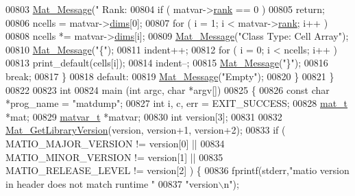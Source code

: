 \begin{DoxyCode}
{{{{{{{{{{{{{{{{{{{{{{{{{{{{{{{{{{{{{{{{{{{{{00803             \hyperlink{group__mat__util_gae7dfa394b111bc908a616f8f5bddaa97}{Mat\_Message}(\textcolor{stringliteral}{"      Rank: %
00804             \textcolor{keywordflow}{if} ( matvar->\hyperlink{group___m_a_t_a84ba70c96ded13cc555fa75b768d9921}{rank} == 0 )
00805                 \textcolor{keywordflow}{return};
00806             ncells = matvar->\hyperlink{group___m_a_t_a8e01234e1c862ce3472bb37f5a09b92c}{dims}[0];
00807             \textcolor{keywordflow}{for} ( i = 1; i < matvar->\hyperlink{group___m_a_t_a84ba70c96ded13cc555fa75b768d9921}{rank}; i++ )
00808                 ncells *= matvar->\hyperlink{group___m_a_t_a8e01234e1c862ce3472bb37f5a09b92c}{dims}[i];
00809             \hyperlink{group__mat__util_gae7dfa394b111bc908a616f8f5bddaa97}{Mat\_Message}(\textcolor{stringliteral}{"Class Type: Cell Array"});
00810             \hyperlink{group__mat__util_gae7dfa394b111bc908a616f8f5bddaa97}{Mat\_Message}(\textcolor{stringliteral}{"\{"});
00811             indent++;
00812             \textcolor{keywordflow}{for} ( i = 0; i < ncells; i++ )
00813                 print\_default(cells[i]);
00814             indent--;
00815             \hyperlink{group__mat__util_gae7dfa394b111bc908a616f8f5bddaa97}{Mat\_Message}(\textcolor{stringliteral}{"\}"});
00816             \textcolor{keywordflow}{break};
00817         \}
00818         \textcolor{keywordflow}{default}:
00819             \hyperlink{group__mat__util_gae7dfa394b111bc908a616f8f5bddaa97}{Mat\_Message}(\textcolor{stringliteral}{"Empty"});
00820     \}
00821 \}
00822 
00823 \textcolor{keywordtype}{int}
00824 main (\textcolor{keywordtype}{int} argc, \textcolor{keywordtype}{char} *argv[])
00825 \{
00826     \textcolor{keyword}{const} \textcolor{keywordtype}{char} *prog\_name = \textcolor{stringliteral}{"matdump"};
00827     \textcolor{keywordtype}{int}   i, c, err = EXIT\_SUCCESS;
00828     \hyperlink{struct__mat__t}{mat\_t}    *mat;
00829     \hyperlink{group___m_a_t_structmatvar__t}{matvar\_t} *matvar;
00830     \textcolor{keywordtype}{int} version[3];
00831 
00832     \hyperlink{mat_8c_a2069c4f0d1106778b56216ff4f95f94b}{Mat\_GetLibraryVersion}(version, version+1, version+2);
00833     \textcolor{keywordflow}{if} ( MATIO\_MAJOR\_VERSION != version[0] ||
00834          MATIO\_MINOR\_VERSION != version[1] ||
00835          MATIO\_RELEASE\_LEVEL != version[2] ) \{
00836         fprintf(stderr,\textcolor{stringliteral}{"matio version in header does not match runtime "}
00837                 \textcolor{stringliteral}{"version\(\backslash\)n"});
}}}}}}}}}}}}}}}}}}}}}}}}}}}}}}}}}}}}}}}}}}}}}}
\end{DoxyCode}

